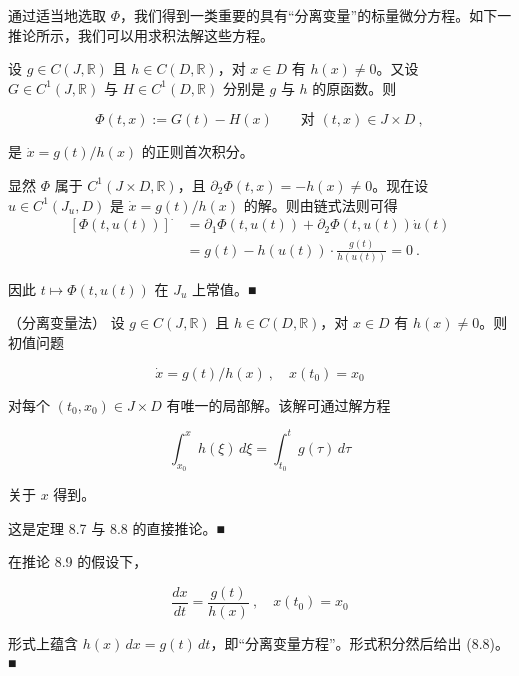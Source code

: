 通过适当地选取 $ \Phi $，我们得到一类重要的具有“分离变量”的标量微分方程。如下一推论所示，我们可以用求积法解这些方程。

\begin{proposition}

设 $ g\in C(J,\mathbb{R}) $ 且 $ h\in C(D,\mathbb{R}) $，对 $ x\in D $ 有 $ h(x)\ne 0 $。又设 $ G\in C^{1}(J,\mathbb{R}) $ 与 $ H\in C^{1}(D,\mathbb{R}) $ 分别是 $ g $ 与 $ h $ 的原函数。则

\[
\Phi(t,x):=G(t)-H(x)\qquad\text{对 }(t,x)\in J\times D\ ,
\]

是 $ \dot{x}=g(t)/h(x) $ 的正则首次积分。

\proofhead
显然 $ \Phi $ 属于 $ C^{1}(J\times D,\mathbb{R}) $，且 $ \partial_{2}\Phi(t,x)=-h(x)\ne 0 $。现在设 $ u\in C^{1}(J_{u},D) $ 是 $ \dot{x}=g(t)/h(x) $ 的解。则由链式法则可得
\begin{equation*}
\begin{aligned}
\left[\Phi(t,u(t))\right]^{\cdot}&=\partial_{1}\Phi(t,u(t))+\partial_{2}\Phi(t,u(t))\dot{u}(t)\\ &=g(t)-h(u(t))\cdot\frac{g(t)}{h(u(t))}=0\ .
\end{aligned}
\end{equation*}

因此 $ t\mapsto\Phi(t,u(t)) $ 在 $ J_{u} $ 上常值。\nobreak\hspace{0.35em}■

\end{proposition}

\begin{corollary}

（分离变量法） 设 $ g\in C(J,\mathbb{R}) $ 且 $ h\in C(D,\mathbb{R}) $，对 $ x\in D $ 有 $ h(x)\ne 0 $。则初值问题

\[
\dot{x}=g(t)/h(x)\ ,\quad x(t_{0})=x_{0}
\]

对每个 $ (t_{0},x_{0})\in J\times D $ 有唯一的局部解。该解可通过解方程

\begin{equation}
\int_{x_{0}}^{x}h(\xi)\,d\xi=\int_{t_{0}}^{t}g(\tau)\,d\tau\tag{8.8}
\end{equation}

关于 $ x $ 得到。

\proofhead
这是定理 8.7 与 8.8 的直接推论。\nobreak\hspace{0.35em}■
\end{corollary}

\begin{remark}

在推论 8.9 的假设下，

\[
\frac{dx}{dt}=\frac{g(t)}{h(x)}\ ,\quad x(t_{0})=x_{0}
\]

形式上蕴含 $ h(x)\,dx=g(t)\,dt $，即“分离变量方程”。形式积分然后给出 (8.8)。\nobreak\hspace{0.35em}■

\end{remark}

